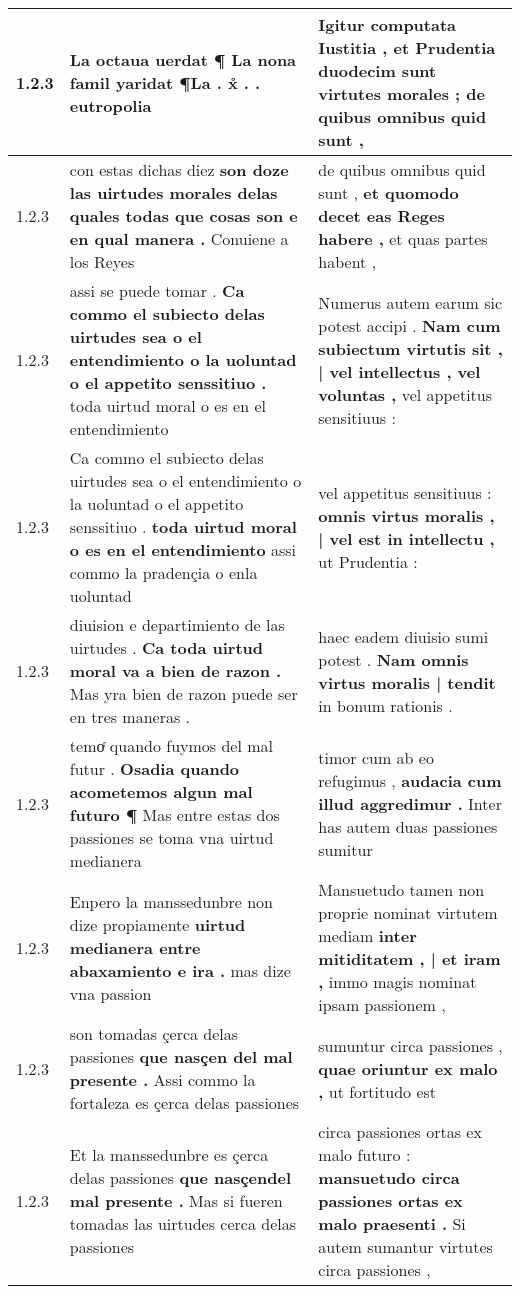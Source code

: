 \begin{tabular}{|p{1cm}|p{6.5cm}|p{6.5cm}|}
1.2.3 & La octaua uerdat ¶ \textbf{ La nona famil yaridat } ¶La . x̊ . . eutropolia & Igitur computata Iustitia , \textbf{ et Prudentia duodecim sunt virtutes morales ; } de quibus omnibus quid sunt , \\\hline
1.2.3 & con estas dichas diez \textbf{ son doze las uirtudes morales delas quales todas que cosas son e en qual manera . } Conuiene a los Reyes & de quibus omnibus quid sunt , \textbf{ et quomodo decet eas Reges habere , } et quas partes habent , \\\hline
1.2.3 & assi se puede tomar . \textbf{ Ca commo el subiecto delas uirtudes sea o el entendimiento o la uoluntad o el appetito senssitiuo . } toda uirtud moral o es en el entendimiento & Numerus autem earum sic potest accipi . \textbf{ Nam cum subiectum virtutis sit , | vel intellectus , vel voluntas , } vel appetitus sensitiuus : \\\hline
1.2.3 & Ca commo el subiecto delas uirtudes sea o el entendimiento o la uoluntad o el appetito senssitiuo . \textbf{ toda uirtud moral o es en el entendimiento } assi commo la pradençia o enla uoluntad & vel appetitus sensitiuus : \textbf{ omnis virtus moralis , | vel est in intellectu , } ut Prudentia : \\\hline
1.2.3 & diuision e departimiento de las uirtudes . \textbf{ Ca toda uirtud moral va a bien de razon . } Mas yra bien de razon puede ser en tres maneras . & haec eadem diuisio sumi potest . \textbf{ Nam omnis virtus moralis | tendit } in bonum rationis . \\\hline
1.2.3 & temoͬ quando fuymos del mal futur . \textbf{ Osadia quando acometemos algun mal futuro ¶ } Mas entre estas dos passiones se toma vna uirtud medianera & timor cum ab eo refugimus , \textbf{ audacia cum illud aggredimur . } Inter has autem duas passiones sumitur \\\hline
1.2.3 & Enpero la manssedunbre non dize propiamente \textbf{ uirtud medianera entre abaxamiento e ira . } mas dize vna passion & Mansuetudo tamen non proprie nominat virtutem mediam \textbf{ inter mitiditatem , | et iram , } immo magis nominat ipsam passionem , \\\hline
1.2.3 & son tomadas çerca delas passiones \textbf{ que nasçen del mal presente . } Assi commo la fortaleza es çerca delas passiones & sumuntur circa passiones , \textbf{ quae oriuntur ex malo , } ut fortitudo est \\\hline
1.2.3 & Et la manssedunbre es çerca delas passiones \textbf{ que nasçendel mal presente . } Mas si fueren tomadas las uirtudes cerca delas passiones & circa passiones ortas ex malo futuro : \textbf{ mansuetudo circa passiones ortas ex malo praesenti . } Si autem sumantur virtutes circa passiones , \\\hline

\end{tabular}
